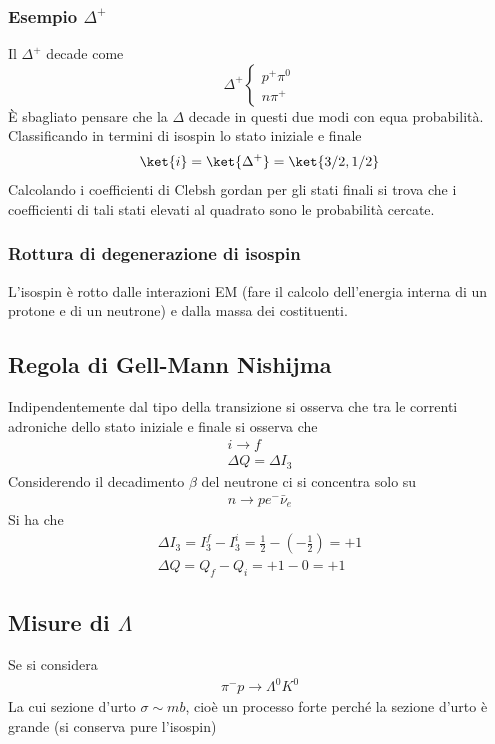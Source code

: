\documentclass[12pt]{book}
\begin{document}
\subsubsection{Esempio $\Delta^+$}
Il $\Delta^+ $ decade come
\begin{equation}
	\Delta^+ \begin{cases}
 	p^+ \pi^0\\
 	n \pi^+
 \end{cases}
\end{equation}
È sbagliato pensare che la $\Delta$ decade in questi due modi con equa probabilità. Classificando in termini di isospin lo stato iniziale e finale
\begin{gather}
	\ket{i} = \ket{\Delta^+} = \ket{3/2 , 1/2}\\
\end{gather}
Calcolando i coefficienti di Clebsh gordan per gli stati finali si trova che i coefficienti di tali stati elevati al quadrato sono le probabilità cercate.

\subsubsection{Rottura di degenerazione di isospin}
L'isospin è rotto dalle interazioni EM (fare il calcolo dell'energia interna di un protone e di un neutrone) e dalla massa dei costituenti.


\subsection{Regola di Gell-Mann Nishijma}
Indipendentemente dal tipo della transizione si osserva che tra le correnti adroniche  dello stato iniziale e finale si osserva che
\begin{gather}
	i \rightarrow f \\
	\Delta Q = \Delta I_3
\end{gather}
Considerendo il decadimento $\beta$ del neutrone ci si concentra solo su
\begin{gather}
	\boxed{n \rightarrow p} e^- \bar \nu _e
\end{gather}
Si ha che 
\begin{gather}
	\Delta I_3 = I_3^f - I_3^i = \frac{1}{2}- \left( - \frac{1}{2} \right) =+1\\
	\Delta Q = Q_f - Q_i = +1 - 0 = +1
\end{gather}

\subsection{Misure di $\Lambda$}
Se si considera 
\begin{gather}
	\pi^- p \rightarrow \Lambda ^0 K^0
\end{gather}
La cui sezione d'urto $\sigma \sim mb$, cioè un processo forte perché la sezione d'urto è grande (si conserva pure l'isospin)
\end{document}
